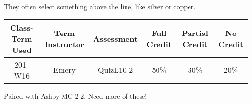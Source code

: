 \begin{outcomes}
They often select something above the line, like silver or copper.

	\begin{center}
		\begin{tabular}{ccc|ccc}
			\hline\hline
			Class-Term Used & Term Instructor & Assessment & Full Credit & Partial Credit & No Credit\\
			\hline
			201-W16 & Emery & QuizL10-2 & 50\% & 30\% & 20\%\\    %
		\end{tabular}
	\end{center}
\end{outcomes}

\begin{comments}

Paired with Ashby-MC-2-2. Need more of these!

\end{comments}
